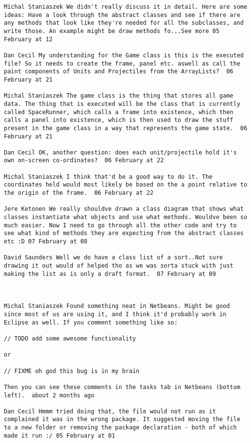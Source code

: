 \begin{verbatim}
Michal Staniaszek We didn't really discuss it in detail. Here are some
ideas: Have a look through the abstract classes and see if there are
any methods that look like they're needed for all the subclasses, and
write those. An example might be draw methods fo...See more 05
February at 12

Dan Cecil My understanding for the Game class is this is the executed
file? So it needs to create the frame, panel etc. aswell as call the
paint components of Units and Projectiles from the ArrayLists?  06
February at 21

Michal Staniaszek The game class is the thing that stores all game
data. The thing that is executed will be the class that is currently
called SpaceRunner, which calls a frame into existence, which then
calls a panel into existence, which is then used to draw the stuff
present in the game class in a way that represents the game state.  06
February at 21

Dan Cecil OK, another question: does each unit/projectile hold it's
own on-screen co-ordinates?  06 February at 22

Michal Staniaszek I think that'd be a good way to do it. The
coordinates held would most likely be based on the a point relative to
the origin of the frame.  06 February at 22

Jere Ketonen We really shouldve drawn a class diagram that shows what
classes instantiate what objects and use what methods. Wouldve been so
much easier. Now I need to go through all the other code and try to
see what kind of methods they are expecting from the abstract classes
etc :D 07 February at 08

David Saunders Well we do have a class list of a sort..Not sure
drawing it out would of helped tho as we was sorta stuck with just
making the list as is only a draft format.  07 February at 09



Michal Staniaszek Found something neat in Netbeans. Might be good
since most of us are using it, and I think it'd probably work in
Eclipse as well. If you comment something like so:

// TODO add some awesome functionality

or

// FIXME oh god this bug is in my brain

Then you can see these comments in the tasks tab in Netbeans (bottom
left).  about 2 months ago

Dan Cecil Hmmm tried doing that, the file would not run as it
complained it was in the wrong package. It suggested moving the file
to a new folder or removing the package declaration - both of which
made it run :/ 05 February at 01


\end{verbatim}
